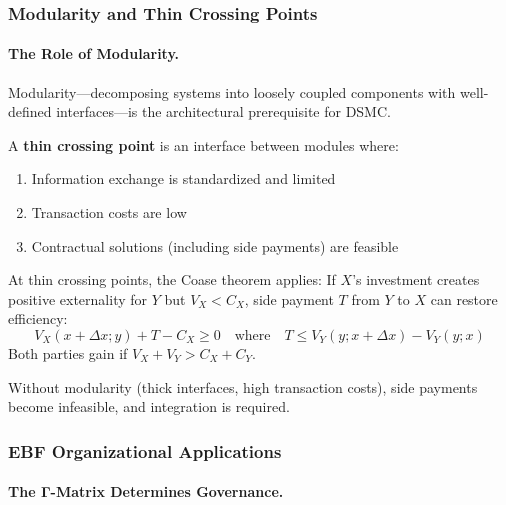 \subsubsection{Modularity and Thin Crossing Points}

\paragraph{The Role of Modularity.}

Modularity---decomposing systems into loosely coupled components with well-defined 
interfaces---is the architectural prerequisite for DSMC.

\begin{definition}
\label{def:thin-crossing}
A \textbf{thin crossing point} is an interface between modules where:
\begin{enumerate}
    \item Information exchange is standardized and limited
    \item Transaction costs are low
    \item Contractual solutions (including side payments) are feasible
\end{enumerate}
\end{definition}

\begin{proposition}
\label{prop:modularity-dsmc}
At thin crossing points, the Coase theorem applies: If $X$'s investment creates 
positive externality for $Y$ but $V_X < C_X$, side payment $T$ from $Y$ to $X$ 
can restore efficiency:
\begin{equation}
V_X(x + \Delta x; y) + T - C_X \geq 0 \quad \text{where} \quad T \leq V_Y(y; x + \Delta x) - V_Y(y; x)
\end{equation}
Both parties gain if $V_X + V_Y > C_X + C_Y$.
\end{proposition}

Without modularity (thick interfaces, high transaction costs), side payments 
become infeasible, and integration is required.

\subsubsection{EBF Organizational Applications}

\paragraph{The Γ-Matrix Determines Governance.}

